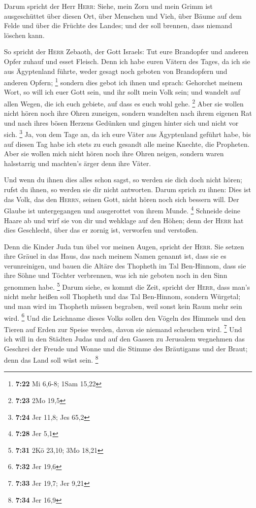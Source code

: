  Darum spricht der Herr \textsc{Herr}: Siehe, mein Zorn
und mein Grimm ist ausgeschüttet über diesen Ort, über Menschen und
Vieh, über Bäume auf dem Felde und über die Früchte des Landes; und der
soll brennen, dass niemand löschen kann.

 So spricht der \textsc{Herr} Zebaoth, der Gott Israels:
Tut eure Brandopfer und anderen Opfer zuhauf und esset Fleisch.
 Denn ich habe euren Vätern des Tages, da ich sie aus
Ägyptenland führte, weder gesagt noch geboten von Brandopfern und
anderen Opfern; \footnote{\textbf{7:22} Mi 6,6-8; 1Sam 15,22}
 sondern dies gebot ich ihnen und sprach: Gehorchet
meinem Wort, so will ich euer Gott sein, und ihr sollt mein Volk sein;
und wandelt auf allen Wegen, die ich euch gebiete, auf dass es euch wohl
gehe. \footnote{\textbf{7:23} 2Mo 19,5}  Aber sie wollen
nicht hören noch ihre Ohren zuneigen, sondern wandelten nach ihrem
eigenen Rat und nach ihres bösen Herzens Gedünken und gingen hinter sich
und nicht vor sich. \footnote{\textbf{7:24} Jer 11,8; Jes 65,2}
 Ja, von dem Tage an, da ich eure Väter aus Ägyptenland
geführt habe, bis auf diesen Tag habe ich stets zu euch gesandt alle
meine Knechte, die Propheten.  Aber sie wollen mich nicht
hören noch ihre Ohren neigen, sondern waren halsstarrig und machten's
ärger denn ihre Väter.

 Und wenn du ihnen dies alles schon sagst, so werden sie
dich doch nicht hören; rufst du ihnen, so werden sie dir nicht
antworten.  Darum sprich zu ihnen: Dies ist das Volk, das
den \textsc{Herrn}, seinen Gott, nicht hören noch sich bessern will. Der
Glaube ist untergegangen und ausgerottet von ihrem Munde. \footnote{\textbf{7:28}
  Jer 5,1}  Schneide deine Haare ab und wirf sie von dir
und wehklage auf den Höhen; denn der \textsc{Herr} hat dies Geschlecht,
über das er zornig ist, verworfen und verstoßen.

 Denn die Kinder Juda tun übel vor meinen Augen, spricht
der \textsc{Herr}. Sie setzen ihre Gräuel in das Haus, das nach meinem
Namen genannt ist, dass sie es verunreinigen,  und bauen
die Altäre des Thopheth im Tal Ben-Hinnom, dass sie ihre Söhne und
Töchter verbrennen, was ich nie geboten noch in den Sinn genommen habe.
\footnote{\textbf{7:31} 2Kö 23,10; 3Mo 18,21}  Darum
siehe, es kommt die Zeit, spricht der \textsc{Herr}, dass man's nicht
mehr heißen soll Thopheth und das Tal Ben-Hinnom, sondern Würgetal; und
man wird im Thopheth müssen begraben, weil sonst kein Raum mehr sein
wird. \footnote{\textbf{7:32} Jer 19,6}  Und die
Leichname dieses Volks sollen den Vögeln des Himmels und den Tieren auf
Erden zur Speise werden, davon sie niemand scheuchen wird. \footnote{\textbf{7:33}
  Jer 19,7; Jer 9,21}  Und ich will in den Städten Judas
und auf den Gassen zu Jerusalem wegnehmen das Geschrei der Freude und
Wonne und die Stimme des Bräutigams und der Braut; denn das Land soll
wüst sein. \footnote{\textbf{7:34} Jer 16,9}

